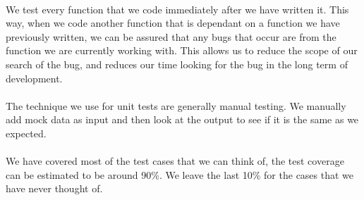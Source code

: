 \documentclass{article}
\begin{document}
\paragraph{}We test every function that we code immediately after we have written it. This way, when we code another function that is dependant on a function we have previously written, we can be assured that any bugs that occur are from the function we are currently working with. This allows us to reduce the scope of our search of the bug, and reduces our time looking for the bug in the long term of development.

\paragraph{}The technique we use for unit tests are generally manual testing. We manually add mock data as input and then look at the output to see if it is the same as we expected.

\paragraph{}We have covered most of the test cases that we can think of, the test coverage can be estimated to be around 90\%. We leave the last 10\% for the cases that we have never thought of.
\end{document}
